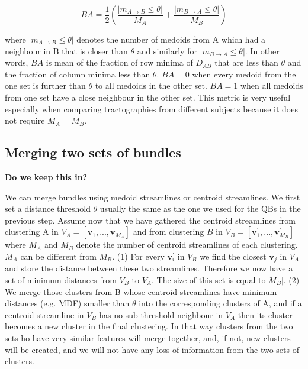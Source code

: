 \documentclass{bioinfo}
\begin{document}
\begin{methods}
\begin{equation}
BA=\frac{1}{2}\left(\frac{|m_{A\rightarrow B}\leq \theta |}{M_{A}}+\frac{|m_{B\rightarrow A}\leq \theta |}{M_{B}}\right)\label{eq:TC}
\end{equation}

\noindent where $|m_{A\rightarrow B}\leq \theta |$ denotes the number of
medoids from A which had a neighbour in B that is closer than $\theta$
and similarly for $|m_{B\rightarrow A}\leq \theta |$.  In other words,
$BA$ is mean of the fraction of row minima of $D_{AB}$ that are less
than $\theta$ and the fraction of column minima less than $\theta$.
$BA=0$ when every medoid from the one set is further than $\theta$ to
all medoids in the other set. $BA=1$ when all medoids from one set
have a close neighbour in the other set. This metric is very useful
especially when comparing tractographies from different subjects because
it does not require $M_{A}=M_{B}$.

\subsection{Merging two sets of bundles\label{sub:merging}}

\textbf{Do we keep this in?}

We can merge bundles using medoid streamlines or centroid
streamlines. We first set a distance threshold $\theta$ usually the same
as the one we used for the QBs in the previous step. Assume now that we
have gathered the centroid streamlines from clustering A in
$V_{A}=[\mathbf{v}_{1},...,\mathbf{v}_{M_{A}}]$ and from clustering $B$
in $V_{B}=[\mathbf{v}_{1}^{'},...,\mathbf{v}_{M_{B}}^{'}]$ where $M_A$
and $M_B$ denote the number of centroid streamlines of each clustering.
$M_{A}$ can be different from $M_{B}$. (1) For every
$\mathbf{v}_{i}^{'}$ in $V_{B}$ we find the closest $\mathbf{v}_{j}$ in
$V_{A}$ and store the distance between these two streamlines. Therefore
we now have a set of minimum distances from $V_{B}$ to $V_{A}$. The size
of this set is equal to $M_{B}|$. (2) We merge those clusters from B
whose centroid streamlines have minimum distances (e.g. MDF) smaller than
$\theta$ into the corresponding clusters of A, and if a centroid
streamline in $V_{B}$ has no sub-threshold neighbour in $V_{A}$ then its
cluster becomes a new cluster in the final clustering. In that way
clusters from the two sets ho have very similar features will merge
together, and, if not, new clusters will be created, and we will not
have any loss of information from the two sets of clusters.


\end{methods}
\end{document}
